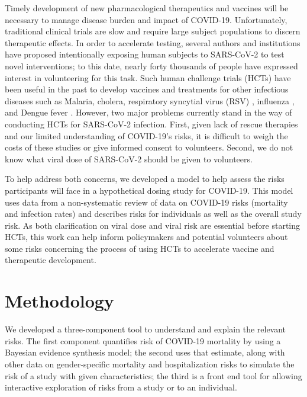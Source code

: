 \documentclass{article}
\begin{document}
Timely development of new pharmacological therapeutics and vaccines will be necessary to manage disease burden and impact of COVID-19.
Unfortunately, traditional clinical trials are slow and require large subject populations to discern therapeutic effects. In order to accelerate testing, several authors and institutions have proposed intentionally exposing human subjects to SARS-CoV-2 to test novel interventions; to this date, nearly forty thousands of people have expressed interest in volunteering for this task\cite{1DSWeb}. Such human challenge trials (HCTs) have been useful in the past to develop vaccines and treatments for other infectious diseases such as Malaria, cholera, respiratory syncytial virus (RSV) \cite{roestenberg2018experimental, gomez2015controlled}, influenza \cite{treanor1999evaluation}, and Dengue fever \cite{larsen2015dengue}. However, two major problems currently stand in the way of conducting HCTs for SARS-CoV-2 infection. First, given lack of rescue therapies and our limited understanding of COVID-19’s risks, it is difficult to weigh the costs of these studies or give informed consent to volunteers\cite{palmer2020}. Second, we do not know what viral dose of SARS-CoV-2 should be given to volunteers. 

To help address both concerns, we developed a model to help assess the risks participants will face in a hypothetical dosing study for COVID-19. This model uses data from a non-systematic review of data on COVID-19 risks (mortality and infection rates) and describes risks for individuals as well as the overall study risk. As both clarification on viral dose and viral risk are essential before starting HCTs, this work can help inform policymakers and potential volunteers about some risks concerning the process of using HCTs to accelerate vaccine and therapeutic development.

\section{Methodology}

We developed a three-component tool to understand and explain the relevant risks. The first component quantifies risk of COVID-19 mortality by using a Bayesian evidence synthesis model; the second uses that estimate, along with other data on gender-specific mortality and hospitalization risks to simulate the risk of a study with given characteristics; the third is a front end tool for allowing interactive exploration of risks from a study or to an individual.
\end{document}

